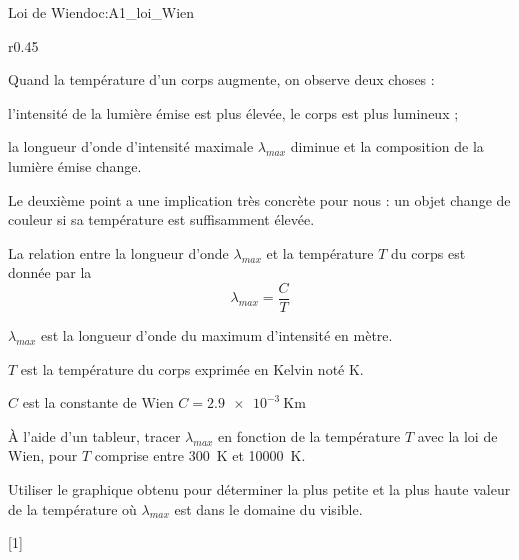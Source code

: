 \begin{doc}{Loi de Wien}{doc:A1_loi_Wien}
  \begin{wrapfigure}[10]{r}{0.45\linewidth}
    \vspace*{-28pt}
    \centering
  \end{wrapfigure}
  
  Quand la température d'un corps augmente, on observe deux choses :
  \begin{listeTirets}
    \item l'intensité de la lumière émise est plus élevée, le corps est plus lumineux ;
    \item la longueur d'onde d'intensité maximale $\lambda_{max}$ diminue et la composition de la lumière émise change.
  \end{listeTirets}
  Le deuxième point a une implication très concrète pour nous : un objet change de couleur si sa température est suffisamment élevée.
  \smallskip

  \begin{importants}
    La relation entre la longueur d'onde $\lambda_{max}$ et la température $T$ du corps est donnée par la 
    \begin{equation*}
      \lambda_{max} = \dfrac{C}{T}
    \end{equation*}
    \begin{listePoints}
      \item $\lambda_{max}$ est la longueur d'onde du maximum d'intensité en mètre.
      \item $T$ est la température du corps exprimée en Kelvin noté \unit{\kelvin}.
      \item $C$ est la constante de Wien $C = \qty{2,9e-3}{\kelvin\m}$
    \end{listePoints}
  \end{importants}
\end{doc}


\mesure
À l'aide d'un tableur, tracer $\lambda_{max}$ en fonction de la température $T$ avec la loi de Wien, pour $T$ comprise entre \qty{300}{\kelvin} et \qty{10000}{\kelvin}.

\mesure
Utiliser le graphique obtenu pour déterminer la plus petite et la plus haute valeur de la température où $\lambda_{max}$ est dans le domaine du visible.

[1]

